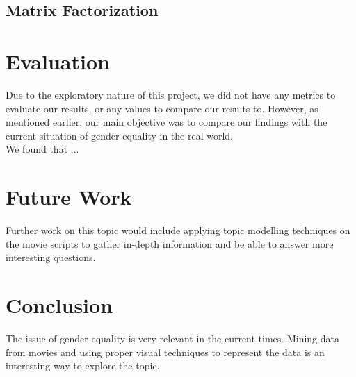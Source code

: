 \documentclass[12pt]{article}
\begin{document}
\subsection{Matrix Factorization}


\section{Evaluation}
Due to the exploratory nature of this project, we did not have any metrics to evaluate our results, or any values to compare our results to. However, as mentioned earlier, our main objective was to compare our findings with the current situation of gender equality in the real world. \\

We found that ...

\section{Future Work}
Further work on this topic would include applying topic modelling techniques on the movie scripts to gather in-depth information and be able to answer more interesting questions. 

\section{Conclusion}
The issue of gender equality is very relevant in the current times. Mining data from movies and using proper visual techniques to represent the data is an interesting way to explore the topic.



\end{document}
